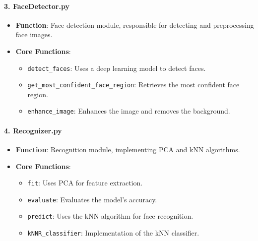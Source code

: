 \documentclass{article}
\begin{document}
\paragraph{3. FaceDetector.py}
\begin{itemize}
    \item \textbf{Function}: Face detection module, responsible for detecting and preprocessing face images.
    \item \textbf{Core Functions}:
    \begin{itemize}
        \item \texttt{detect\_faces}: Uses a deep learning model to detect faces.
        \item \texttt{get\_most\_confident\_face\_region}: Retrieves the most confident face region.
        \item \texttt{enhance\_image}: Enhances the image and removes the background.
    \end{itemize}
\end{itemize}

\paragraph{4. Recognizer.py}
\begin{itemize}
    \item \textbf{Function}: Recognition module, implementing PCA and kNN algorithms.
    \item \textbf{Core Functions}:
    \begin{itemize}
        \item \texttt{fit}: Uses PCA for feature extraction.
        \item \texttt{evaluate}: Evaluates the model's accuracy.
        \item \texttt{predict}: Uses the kNN algorithm for face recognition.
        \item \texttt{kNNR\_classifier}: Implementation of the kNN classifier.
    \end{itemize}
\end{itemize}
\end{document}
